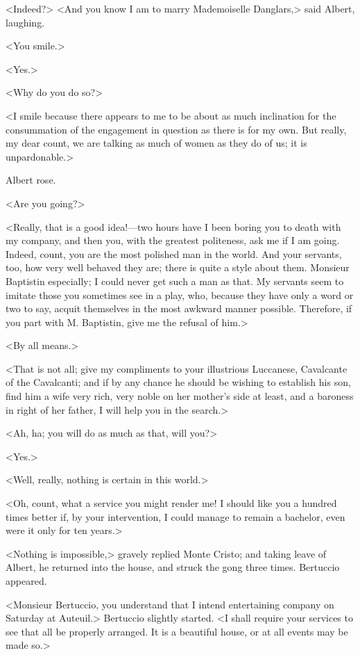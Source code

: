  <Indeed?>  <And you know I am to marry Mademoiselle Danglars,> said Albert, laughing. 

 <You smile.> 

 <Yes.> 

 <Why do you do so?> 

 <I smile because there appears to me to be about as much inclination for the consummation of the engagement in question as there is for my own. But really, my dear count, we are talking as much of women as they do of us; it is unpardonable.> 

 Albert rose. 

 <Are you going?> 

 <Really, that is a good idea!—two hours have I been boring you to death with my company, and then you, with the greatest politeness, ask me if I am going. Indeed, count, you are the most polished man in the world. And your servants, too, how very well behaved they are; there is quite a style about them. Monsieur Baptistin especially; I could never get such a man as that. My servants seem to imitate those you sometimes see in a play, who, because they have only a word or two to say, acquit themselves in the most awkward manner possible. Therefore, if you part with M. Baptistin, give me the refusal of him.> 

 <By all means.> 

 <That is not all; give my compliments to your illustrious Luccanese, Cavalcante of the Cavalcanti; and if by any chance he should be wishing to establish his son, find him a wife very rich, very noble on her mother's side at least, and a baroness in right of her father, I will help you in the search.> 

 <Ah, ha; you will do as much as that, will you?> 

 <Yes.> 

 <Well, really, nothing is certain in this world.> 

 <Oh, count, what a service you might render me! I should like you a hundred times better if, by your intervention, I could manage to remain a bachelor, even were it only for ten years.> 

 <Nothing is impossible,> gravely replied Monte Cristo; and taking leave of Albert, he returned into the house, and struck the gong three times. Bertuccio appeared. 

 <Monsieur Bertuccio, you understand that I intend entertaining company on Saturday at Auteuil.> Bertuccio slightly started. <I shall require your services to see that all be properly arranged. It is a beautiful house, or at all events may be made so.> 

